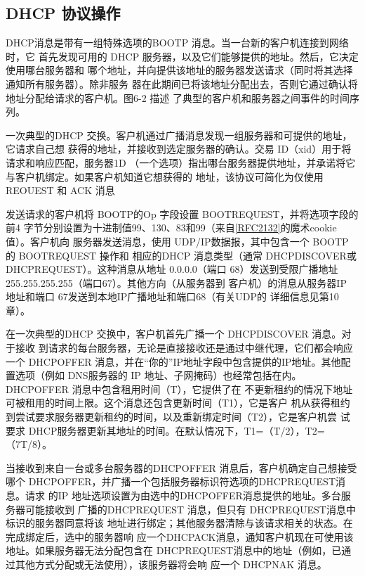 \subsection{DHCP 协议操作}
DHCP消息是带有一组特殊选项的BOOTP 消息。当一台新的客户机连接到网络时，它
首先发现可用的 DHCP 服务器，以及它们能够提供的地址。然后，它决定使用哪台服务器和
哪个地址，并向提供该地址的服务器发送请求（同时将其选择通知所有服务器）。除非服务
器在此期间已将该地址分配出去，否则它通过确认将地址分配给请求的客户机。图6-2 描述
了典型的客户机和服务器之间事件的时间序列。


一次典型的DHCP 交换。客户机通过广播消息发现一组服务器和可提供的地址，它请求自己想
获得的地址，并接收到选定服务器的确认。交易 ID（xid）用于将请求和响应匹配，服务器1D
（一个选项）指出哪台服务器提供地址，并承诺将它与客户机绑定。如果客户机知道它想获得的
地址，该协议可简化为仅使用 REOUEST 和 ACK 消息

发送请求的客户机将 BOOTP的Op 字段设置 BOOTREQUEST，并将选项字段的前4
字节分别设置为十进制值99、130、83和99（来自\href{https://www.rfc-editor.org/rfc/rfc2132}{\href{https://www.rfc-editor.org/rfc/rfc2132}{[RFC2132]}}的魔术cookie 值）。客户机向
服务器发送消息，使用 UDP/IP数据报，其中包含一个 BOOTP 的 BOOTREQUEST 操作和
相应的DHCP 消息类型（通常 DHCPDISCOVER或 DHCPREQUEST）。这种消息从地址
0.0.0.0（端口 68）发送到受限广播地址 255.255.255.255（端口67）。其他方向（从服务器到
客户机）的消息从服务器IP 地址和端口 67发送到本地IP广播地址和端口68（有关UDP的
详细信息见第10章）。

在一次典型的DHCP 交换中，客户机首先广播一个 DHCPDISCOVER 消息。对于接收
到请求的每台服务器，无论是直接接收还是通过中继代理，它们都会响应一个 DHCPOFFER
消息，并在“你的”IP地址字段中包含提供的IP地址。其他配置选项（例如 DNS服务器的
IP 地址、子网掩码）也经常包括在内。DHCPOFFER 消息中包含租用时间（T），它提供了在
不更新租约的情况下地址可被租用的时间上限。这个消息还包含更新时间（T1），它是客户
机从获得租约到尝试要求服务器更新租约的时间，以及重新绑定时间（T2），它是客户机尝
试要求 DHCP服务器更新其地址的时间。在默认情况下，T1=（T/2），T2=（7T/8）。

当接收到来自一台或多台服务器的DHCPOFFER 消息后，客户机确定自己想接受
哪个 DHCPOFFER，并广播一个包括服务器标识符选项的DHCPREQUEST消息。请求
的IP 地址选项设置为由选中的DHCPOFFER消息提供的地址。多台服务器可能接收到
广播的DHCPREQUEST 消息，但只有 DHCPREQUEST消息中标识的服务器同意将该
地址进行绑定；其他服务器清除与该请求相关的状态。在完成绑定后，选中的服务器响
应一个DHCPACK消息，通知客户机现在可使用该地址。如果服务器无法分配包含在
DHCPREQUEST消息中的地址（例如，已通过其他方式分配或无法使用），该服务器将会响
应一个 DHCPNAK 消息。

